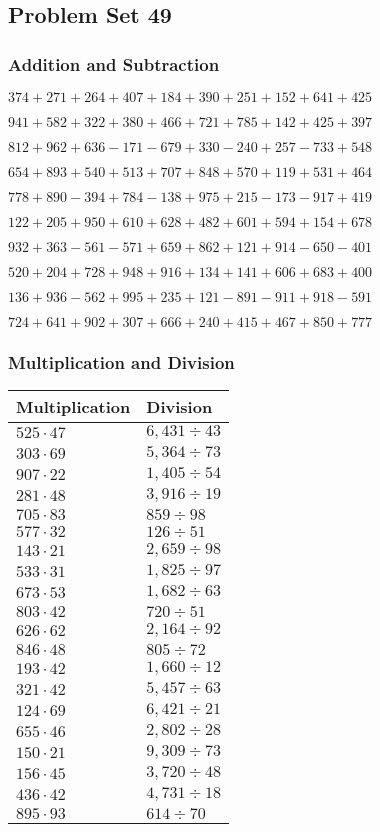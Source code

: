 \hypertarget{problem-set-49-1}{%
\subsection{Problem Set 49}\label{problem-set-49-1}}

\hypertarget{addition-and-subtraction-149}{%
\subsubsection{Addition and
Subtraction}\label{addition-and-subtraction-149}}

\(374 + 271 + 264 + 407 + 184 + 390 + 251 + 152 + 641 + 425\)

\(941 + 582 + 322 + 380 + 466 + 721 + 785 + 142 + 425 + 397\)

\(812 + 962 + 636 - 171 - 679 + 330 - 240 + 257 - 733 + 548\)

\(654 + 893 + 540 + 513 + 707 + 848 + 570 + 119 + 531 + 464\)

\(778 + 890 - 394 + 784 - 138 + 975 + 215 - 173 - 917 + 419\)

\(122 + 205 + 950 + 610 + 628 + 482 + 601 + 594 + 154 + 678\)

\(932 + 363 - 561 - 571 + 659 + 862 + 121 + 914 - 650 - 401\)

\(520 + 204 + 728 + 948 + 916 + 134 + 141 + 606 + 683 + 400\)

\(136 + 936 - 562 + 995 + 235 + 121 - 891 - 911 + 918 - 591\)

\(724 + 641 + 902 + 307 + 666 + 240 + 415 + 467 + 850 + 777\)

\hypertarget{multiplication-and-division-149}{%
\subsubsection{Multiplication and
Division}\label{multiplication-and-division-149}}

\begin{longtable}[]{@{}ll@{}}
\toprule
Multiplication & Division\tabularnewline
\midrule
\endhead
\(525 \cdot 47\) & \(6,431÷43\)\tabularnewline
\(303 \cdot 69\) & \(5,364÷73\)\tabularnewline
\(907 \cdot 22\) & \(1,405÷54\)\tabularnewline
\(281 \cdot 48\) & \(3,916÷19\)\tabularnewline
\(705 \cdot 83\) & \(859÷98\)\tabularnewline
\(577 \cdot 32\) & \(126÷51\)\tabularnewline
\(143 \cdot 21\) & \(2,659÷98\)\tabularnewline
\(533 \cdot 31\) & \(1,825÷97\)\tabularnewline
\(673 \cdot 53\) & \(1,682÷63\)\tabularnewline
\(803 \cdot 42\) & \(720÷51\)\tabularnewline
\(626 \cdot 62\) & \(2,164÷92\)\tabularnewline
\(846 \cdot 48\) & \(805÷72\)\tabularnewline
\(193 \cdot 42\) & \(1,660÷12\)\tabularnewline
\(321 \cdot 42\) & \(5,457÷63\)\tabularnewline
\(124 \cdot 69\) & \(6,421÷21\)\tabularnewline
\(655 \cdot 46\) & \(2,802÷28\)\tabularnewline
\(150 \cdot 21\) & \(9,309÷73\)\tabularnewline
\(156 \cdot 45\) & \(3,720÷48\)\tabularnewline
\(436 \cdot 42\) & \(4,731÷18\)\tabularnewline
\(895 \cdot 93\) & \(614÷70\)\tabularnewline
\bottomrule
\end{longtable}


